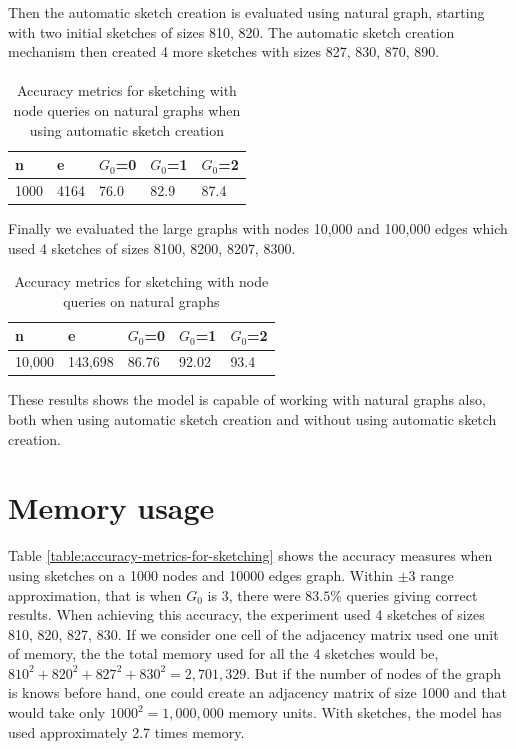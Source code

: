 \documentclass[12pt]{report}
\numberwithin{figure}{section}
\numberwithin{table}{section}
\begin{document}
Then the automatic sketch creation is evaluated using natural graph, starting with two initial sketches of sizes 810, 820. The automatic sketch creation mechanism then created 4 more sketches with sizes 827, 830, 870, 890.

\paragraph{}
 
\begin{table}[H]
\centering
\begin{tabular}{|l|l|l|l|l|}
\hline
n    & e     & $G_0$=0 & $G_0$=1 & $G_0$=2 \\ \hline
1000 & 4164  & 76.0   & 82.9  & 87.4  \\ \hline
\end{tabular}
\caption{Accuracy metrics for sketching with node queries on natural graphs when using automatic sketch creation}
\end{table}

Finally we evaluated the large graphs with nodes 10,000 and 100,000 edges which used 4 sketches of sizes  8100, 8200, 8207, 8300.

\begin{table}[H]
\centering
\begin{tabular}{|l|l|l|l|l|}
\hline
n    & e     & $G_0$=0 & $G_0$=1 & $G_0$=2 \\ \hline
10,000 & 143,698  & 86.76   & 92.02  & 93.4  \\ \hline
\end{tabular}
\caption{Accuracy metrics for sketching with node queries on natural graphs}
\end{table}

These results shows the model is capable of working with natural graphs also, both when using automatic sketch creation and without using automatic sketch creation.

\section{Memory usage}
Table \ref{table:accuracy-metrics-for-sketching} shows the accuracy measures when using sketches on a 1000 nodes and 10000 edges graph. Within $\pm3$ range approximation, that is when $G_0$ is 3, there were $83.5\%$ queries giving correct results. When achieving this accuracy, the experiment used 4 sketches of sizes 810, 820, 827, 830. If we consider one cell of the adjacency matrix used one unit of memory, the the total memory used for all the 4 sketches would be, $810^2+820^2+827^2+830^2 = 2,701,329$. But if the number of nodes of the graph is knows before hand, one could create an adjacency matrix of size 1000 and that would take only $1000^2 = 1,000,000$ memory units. With sketches, the model has used approximately  2.7 times memory. 
\end{document}
